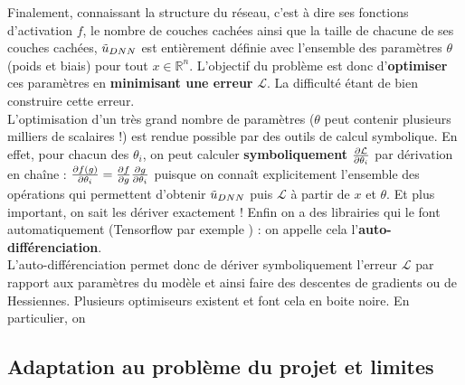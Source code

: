 Finalement, connaissant la structure du réseau, c'est à dire ses fonctions d'activation $f$, le nombre de couches cachées ainsi que la taille de chacune de ses couches cachées, $\Tilde{u}_{DNN}$ est entièrement définie avec l'ensemble des paramètres $\theta$ (poids et biais) pour tout $x\in \mathbb{R}^n$. L'objectif du problème est donc d'\textbf{optimiser} ces paramètres en \textbf{minimisant une erreur} $\mathcal {L}$. La difficulté étant de bien construire cette erreur.\\

L'optimisation d'un très grand nombre de paramètres ($\theta$ peut contenir plusieurs milliers de scalaires !) est rendue possible par des outils de calcul symbolique. En effet, pour chacun des $\theta_i$, on peut calculer \textbf{symboliquement} $\pder[\mathcal{L}]{\theta_i}$ par dérivation en chaîne : $\pder[f(g)]{\theta_i} = \pder[f]{g} \pder[g]{\theta_i}$ puisque on connaît explicitement l'ensemble des opérations qui permettent d'obtenir $\Tilde{u}_{DNN}$ puis $\mathcal{L}$ à partir de $x$ et $\theta$. Et plus important, on sait les dériver exactement ! Enfin on a des librairies qui le font automatiquement (Tensorflow par exemple \cite{PartialDifferentialEquations}) : on appelle cela l'\textbf{auto-différenciation}. \\

L'auto-différenciation permet donc de dériver symboliquement l'erreur $\mathcal{L}$ par rapport aux paramètres du modèle et ainsi faire des descentes de gradients ou de Hessiennes. Plusieurs optimiseurs existent et font cela en boite noire. En particulier, on 



\subsection{Adaptation au problème du projet et limites}

